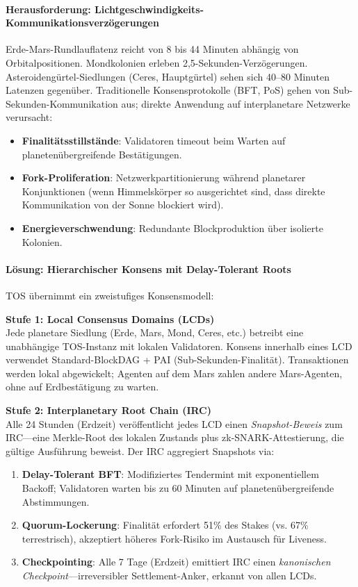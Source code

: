 \documentclass[11pt]{article}
\begin{document}
\paragraph{Herausforderung: Lichtgeschwindigkeits-Kommunikationsverzögerungen}
Erde-Mars-Rundlauflatenz reicht von 8 bis 44 Minuten abhängig von Orbitalpositionen. Mondkolonien erleben 2,5-Sekunden-Verzögerungen. Asteroidengürtel-Siedlungen (Ceres, Hauptgürtel) sehen sich 40--80 Minuten Latenzen gegenüber. Traditionelle Konsensprotokolle (BFT, PoS) gehen von Sub-Sekunden-Kommunikation aus; direkte Anwendung auf interplanetare Netzwerke verursacht:
\begin{itemize}[noitemsep]
  \item \textbf{Finalitätsstillstände}: Validatoren timeout beim Warten auf planetenübergreifende Bestätigungen.
  \item \textbf{Fork-Proliferation}: Netzwerkpartitionierung während planetarer Konjunktionen (wenn Himmelskörper so ausgerichtet sind, dass direkte Kommunikation von der Sonne blockiert wird).
  \item \textbf{Energieverschwendung}: Redundante Blockproduktion über isolierte Kolonien.
\end{itemize}

\paragraph{Lösung: Hierarchischer Konsens mit Delay-Tolerant Roots}
TOS übernimmt ein zweistufiges Konsensmodell:

\textbf{Stufe 1: Local Consensus Domains (LCDs)}\\
Jede planetare Siedlung (Erde, Mars, Mond, Ceres, etc.) betreibt eine unabhängige TOS-Instanz mit lokalen Validatoren. Konsens innerhalb eines LCD verwendet Standard-BlockDAG + PAI (Sub-Sekunden-Finalität). Transaktionen werden lokal abgewickelt; Agenten auf dem Mars zahlen andere Mars-Agenten, ohne auf Erdbestätigung zu warten.

\textbf{Stufe 2: Interplanetary Root Chain (IRC)}\\
Alle 24 Stunden (Erdzeit) veröffentlicht jedes LCD einen \emph{Snapshot-Beweis} zum IRC—eine Merkle-Root des lokalen Zustands plus zk-SNARK-Attestierung, die gültige Ausführung beweist. Der IRC aggregiert Snapshots via:
\begin{enumerate}[noitemsep]
  \item \textbf{Delay-Tolerant BFT}: Modifiziertes Tendermint mit exponentiellem Backoff; Validatoren warten bis zu 60 Minuten auf planetenübergreifende Abstimmungen.
  \item \textbf{Quorum-Lockerung}: Finalität erfordert 51\% des Stakes (vs. 67\% terrestrisch), akzeptiert höheres Fork-Risiko im Austausch für Liveness.
  \item \textbf{Checkpointing}: Alle 7 Tage (Erdzeit) emittiert IRC einen \emph{kanonischen Checkpoint}—irreversibler Settlement-Anker, erkannt von allen LCDs.
\end{enumerate}
\end{document}
